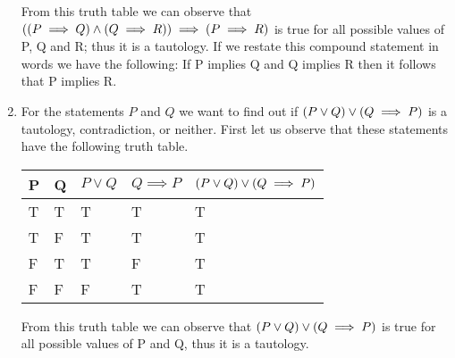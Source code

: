 \documentclass[12pt]{article}
\makeatletter
\newcommand*{\arabicodd}[1]{%
  \expandafter\@arabicodd\csname c@#1\endcsname
}
\newcommand*{\@arabicodd}[1]{%
  \@arabic{\numexpr(#1)*2-1\relax}%
}
\makeatother
\begin{document}
\begin{enumerate}[label=2.\arabicodd*, start=24]
        \linebreak
        \linebreak
        From this truth table we can observe that $\qty(\qty(P \implies Q) \land \qty(Q \implies R)) \implies \qty(P \implies R)$
        is true for all possible values of P, Q and R; thus it is a tautology.
        If we restate this compound statement in words we have the following:
        If P implies Q and Q implies R then it follows that P implies R.
  \item
        For the statements $P$ and $Q$ we want to find out if $\qty(P \lor Q) \lor \qty(Q \implies P)$
        is a tautology, contradiction, or neither. First let us observe that these statements have the following
        truth table.
        \hfill
        \hfill
        \linebreak
        \linebreak
        \begin{minipage}{\linewidth}
          \small
          \begin{tabular}{@{}lllll@{}}
            \toprule
            P & Q & $P \lor Q$ & $Q \implies P$ & $\qty(P \lor Q) \lor \qty(Q \implies P)$ \\ \midrule
            T & T & T          & T              & T                                        \\
            T & F & T          & T              & T                                        \\
            F & T & T          & F              & T                                        \\
            F & F & F          & T              & T                                        \\
            \bottomrule
          \end{tabular}
        \end{minipage}
        \linebreak
        \linebreak
        \linebreak
        \linebreak
        From this truth table we can observe that $\qty(P \lor Q) \lor \qty(Q \implies P)$
        is true for all possible values of P and Q, thus it is a tautology.
\end{enumerate}
\end{document}

